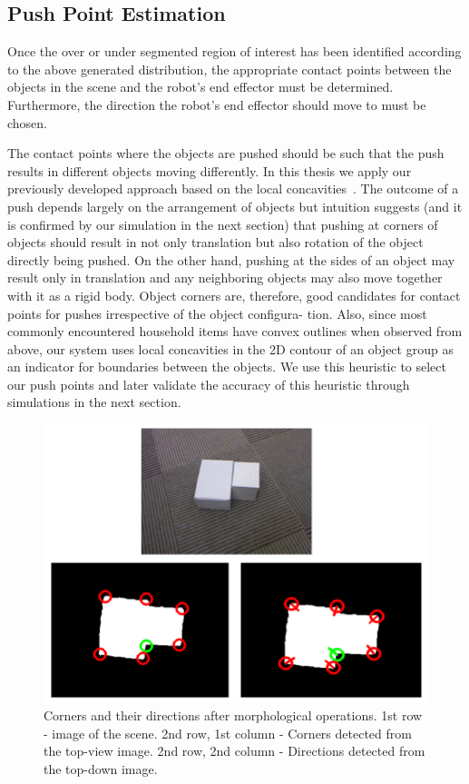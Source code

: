 \subsection{Push Point Estimation}
\label{sec:push-point}
Once the over or under segmented region of interest has been identified 
according to the above generated distribution, the  appropriate contact
points  between the objects in   the   scene  and   the   robot's   end   
effector  must   be determined. Furthermore, the  direction   the robot's  end
effector should move to must be chosen.

The contact points where the objects are pushed should
be such that the push results in different objects moving
differently.
In  this thesis we apply our previously developed approach based on 
the local concavities~\cite{bersch12interactive}. The outcome
of a push depends largely on the arrangement of objects but
intuition suggests (and it is confirmed by our simulation in the next section) that pushing at corners of objects should
result in not only translation but also rotation of the object
directly being pushed. On the other hand, pushing at the
sides of an object may result only in translation and any
neighboring objects may also move together with it as a
rigid body. Object corners are, therefore, good candidates for
contact points for pushes irrespective of the object configura-
tion. Also, since most
commonly  encountered  household   items  have  convex  outlines  when
observed  from  above,  our  system  uses  local
concavities in the  2D contour of an object group  as an indicator for
boundaries between the objects.
We use this heuristic to select our push points and later
validate the accuracy of this heuristic through simulations in
the next section.

\begin{figure}[tb!]
   \begin{center}
     \includegraphics[width=.9\columnwidth]{figures/corners.png}
		\vspace{-2ex}
   \caption{Corners and their directions after morphological operations. 1st row - image of the scene. 2nd row, 1st column - Corners detected from the top-view image. 2nd row, 2nd column - Directions detected from the top-down image. }
   \label{fig:corners}
 \end{center}
 \end{figure}

